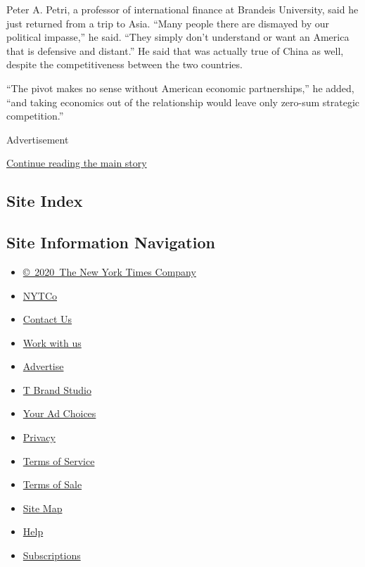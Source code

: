 Peter A. Petri, a professor of international finance at Brandeis
University, said he just returned from a trip to Asia. ``Many people
there are dismayed by our political impasse,'' he said. ``They simply
don't understand or want an America that is defensive and distant.'' He
said that was actually true of China as well, despite the
competitiveness between the two countries.

``The pivot makes no sense without American economic partnerships,'' he
added, ``and taking economics out of the relationship would leave only
zero-sum strategic competition.''

Advertisement

\protect\hyperlink{after-bottom}{Continue reading the main story}

\hypertarget{site-index}{%
\subsection{Site Index}\label{site-index}}

\hypertarget{site-information-navigation}{%
\subsection{Site Information
Navigation}\label{site-information-navigation}}

\begin{itemize}
\tightlist
\item
  \href{https://help.nytimes.com/hc/en-us/articles/115014792127-Copyright-notice}{©~2020~The
  New York Times Company}
\end{itemize}

\begin{itemize}
\tightlist
\item
  \href{https://www.nytco.com/}{NYTCo}
\item
  \href{https://help.nytimes.com/hc/en-us/articles/115015385887-Contact-Us}{Contact
  Us}
\item
  \href{https://www.nytco.com/careers/}{Work with us}
\item
  \href{https://nytmediakit.com/}{Advertise}
\item
  \href{http://www.tbrandstudio.com/}{T Brand Studio}
\item
  \href{https://www.nytimes.com/privacy/cookie-policy\#how-do-i-manage-trackers}{Your
  Ad Choices}
\item
  \href{https://www.nytimes.com/privacy}{Privacy}
\item
  \href{https://help.nytimes.com/hc/en-us/articles/115014893428-Terms-of-service}{Terms
  of Service}
\item
  \href{https://help.nytimes.com/hc/en-us/articles/115014893968-Terms-of-sale}{Terms
  of Sale}
\item
  \href{https://spiderbites.nytimes.com}{Site Map}
\item
  \href{https://help.nytimes.com/hc/en-us}{Help}
\item
  \href{https://www.nytimes.com/subscription?campaignId=37WXW}{Subscriptions}
\end{itemize}
